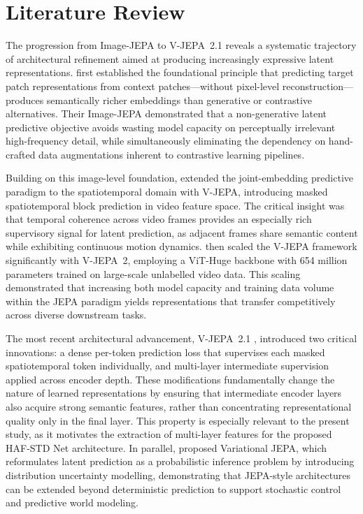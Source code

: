 \section{Literature Review}


The progression from Image-JEPA to V-JEPA~2.1 reveals a systematic trajectory of architectural refinement aimed at producing increasingly expressive latent representations. \citet{assran2023ijepa} first established the foundational principle that predicting target patch representations from context patches---without pixel-level reconstruction---produces semantically richer embeddings than generative or contrastive alternatives. Their Image-JEPA demonstrated that a non-generative latent predictive objective avoids wasting model capacity on perceptually irrelevant high-frequency detail, while simultaneously eliminating the dependency on hand-crafted data augmentations inherent to contrastive learning pipelines.

Building on this image-level foundation, \citet{bardes2024vjepa} extended the joint-embedding predictive paradigm to the spatiotemporal domain with V-JEPA, introducing masked spatiotemporal block prediction in video feature space. The critical insight was that temporal coherence across video frames provides an especially rich supervisory signal for latent prediction, as adjacent frames share semantic content while exhibiting continuous motion dynamics. \citet{assran2025vjepa2} then scaled the V-JEPA framework significantly with V-JEPA~2, employing a ViT-Huge backbone with 654 million parameters trained on large-scale unlabelled video data. This scaling demonstrated that increasing both model capacity and training data volume within the JEPA paradigm yields representations that transfer competitively across diverse downstream tasks.

The most recent architectural advancement, V-JEPA~2.1 \citep{murlabadia2026vjepa21}, introduced two critical innovations: a dense per-token prediction loss that supervises each masked spatiotemporal token individually, and multi-layer intermediate supervision applied across encoder depth. These modifications fundamentally change the nature of learned representations by ensuring that intermediate encoder layers also acquire strong semantic features, rather than concentrating representational quality only in the final layer. This property is especially relevant to the present study, as it motivates the extraction of multi-layer features for the proposed HAF-STD Net architecture. In parallel, \citet{huang2026vjepa} proposed Variational JEPA, which reformulates latent prediction as a probabilistic inference problem by introducing distribution uncertainty modelling, demonstrating that JEPA-style architectures can be extended beyond deterministic prediction to support stochastic control and predictive world modeling.


